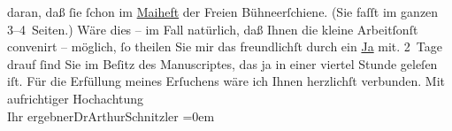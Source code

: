 \begin{ledgroupsized}[t]{13cm}
                    daran, daß ſie ſchon im \uline{Maiheft} der Freien Bühneerſchiene. (Sie faſſt im ganzen 3–4 Seiten.) Wäre dies
                    – im Fall natürlich, daß Ihnen die kleine Arbeitſonſt convenirt – möglich, ſo theilen Sie mir
                    das freundlichſt durch ein \uline{Ja} mit. 2 Tage drauf
                    ſind Sie im Beſitz des Manuscriptes, das ja in einer viertel Stunde geleſen iſt.\pend
           \pstart
           Für die Erfüllung meines Erſuchens wäre ich Ihnen herzlichſt verbunden.\pend
           \pstart
           Mit aufrichtiger Hochachtung{\\[\baselineskip]}Ihr ergebner\spacefill\mbox{DrArthurSchnitzler}\pend
           \leftskip=0em{}
         
         \endnumbering{}\end{ledgroupsized}  \newcommand{\dateiname}{L00089}\newcommand{\titel}{Arthur Schnitzler an Wilhelm Bölsche, 27. 3. 1892}\newcommand{\editorInnen}{Martin Anton Müller und Gerd-Hermann Susen}
      